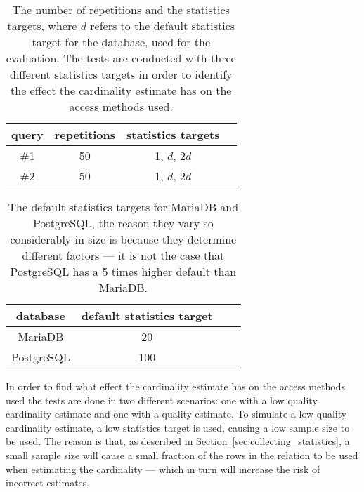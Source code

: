 \begin{table}
  \begin{center}
    \begin{tabu} {c c c c}
      \toprule
      query & repetitions & statistics targets \\
      \midrule
      \#1 & 50 & 1, $d$, $2d$ \\
      \#2 & 50 & 1, $d$, $2d$ \\
      \bottomrule
    \end{tabu}
    \caption[The number of repetitions and statistics targets used for the first
    evaluation]{The number of repetitions and the statistics targets, where $d$
      refers to the default statistics target for the database, used for the
      evaluation. The tests are conducted with three different statistics
      targets in order to identify the effect the cardinality estimate has on
      the access methods used.}\label{table:evaluation1}
  \end{center}
\end{table}

\begin{table}
  \begin{center}
    \begin{tabu} {c c c c}
      \toprule
      database & default statistics target \\
      \midrule
      MariaDB & 20 \\
      PostgreSQL & 100 \\
      \bottomrule
    \end{tabu}
    \caption[The default statistics targets for MariaDB and PostgreSQL]{The
      default statistics targets for MariaDB and PostgreSQL, the reason they
      vary so considerably in size is because they determine different factors
      --- it is not the case that PostgreSQL has a 5 times higher default than
      MariaDB.}\label{table:defaults}
  \end{center}
\end{table}

In order to find what effect the cardinality estimate has on the access methods
used the tests are done in two different scenarios: one with a low quality
cardinality estimate and one with a quality estimate. To simulate a low quality
cardinality estimate, a low statistics target is used, causing a low sample size
to be used. The reason is that, as described in
Section~\ref{sec:collecting_statistics}, a small sample size will cause a small
fraction of the rows in the relation to be used when estimating the cardinality
--- which in turn will increase the risk of incorrect estimates.

